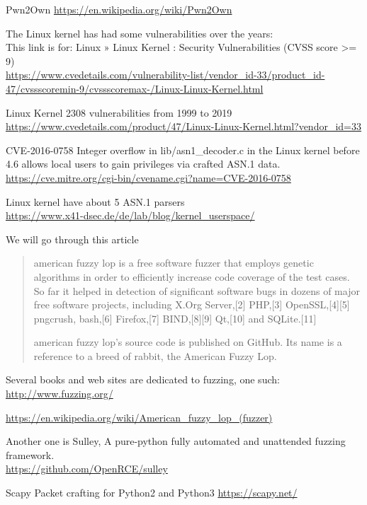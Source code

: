 \documentclass[Screen16to9,17pt]{foils}
\begin{document}
Pwn2Own
\url{https://en.wikipedia.org/wiki/Pwn2Own}



The Linux kernel has had some vulnerabilities over the years:\\
This link is for: Linux » Linux Kernel : Security Vulnerabilities (CVSS score >= 9)\\

{\footnotesize\url{https://www.cvedetails.com/vulnerability-list/vendor_id-33/product_id-47/cvssscoremin-9/cvssscoremax-/Linux-Linux-Kernel.html}}

Linux Kernel 2308 vulnerabilities from 1999 to 2019\\
\url{https://www.cvedetails.com/product/47/Linux-Linux-Kernel.html?vendor_id=33}


\begin{list2}
\item CVE-2016-0758 Integer overflow in lib/asn1\_decoder.c in the Linux kernel before 4.6 allows local users to gain privileges via crafted ASN.1 data.\\
\url{https://cve.mitre.org/cgi-bin/cvename.cgi?name=CVE-2016-0758}
\item Linux kernel have about 5 ASN.1 parsers\\
\url{https://www.x41-dsec.de/de/lab/blog/kernel_userspace/}
\end{list2}

We will go through this article





\begin{quote}
american fuzzy lop is a free software fuzzer that employs genetic algorithms in order to efficiently increase code coverage of the test cases. So far it helped in detection of significant software bugs in dozens of major free software projects, including X.Org Server,[2] PHP,[3] OpenSSL,[4][5] pngcrush, bash,[6] Firefox,[7] BIND,[8][9] Qt,[10] and SQLite.[11]

american fuzzy lop's source code is published on GitHub. Its name is a reference to a breed of rabbit, the American Fuzzy Lop.
\end{quote}

\begin{list2}
\item Several books and web sites are dedicated to fuzzing, one such:\\ \url{http://www.fuzzing.org/}
\item \url{https://en.wikipedia.org/wiki/American_fuzzy_lop_(fuzzer)}
\item Another one is Sulley, A pure-python fully automated and unattended fuzzing framework.\\
\url{https://github.com/OpenRCE/sulley}
\item Scapy Packet crafting for Python2 and Python3
\url{https://scapy.net/}
\end{list2}
\end{document}
